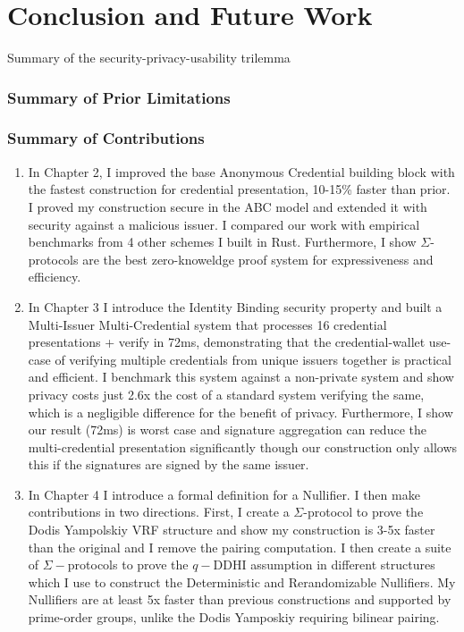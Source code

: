\chapter{Conclusion and Future Work}\label{chap7}
Summary of the security-privacy-usability trilemma


\subsection{Summary of Prior Limitations}



\subsection{Summary of Contributions}
\begin{enumerate}
    \item In Chapter 2, I improved the base Anonymous Credential building block with the fastest construction for credential presentation, 10-15\% faster than prior. I proved my construction secure in the ABC model and extended it with security against a malicious issuer. I compared our work with empirical benchmarks from 4 other schemes I built in Rust. Furthermore, I show $\Sigma$-protocols are the best zero-knoweldge proof system for expressiveness and efficiency. 

    \item In Chapter 3 I introduce the Identity Binding security property and built a Multi-Issuer Multi-Credential system that processes 16 credential presentations + verify in 72ms, demonstrating that the credential-wallet use-case of verifying multiple credentials from unique issuers together is practical and efficient. I benchmark this system against a non-private system and show privacy costs just 2.6x the cost of a standard system verifying the same, which is a negligible difference for the benefit of privacy. Furthermore, I show our result (72ms) is worst case and signature aggregation can reduce the multi-credential presentation significantly though our construction only allows this if the signatures are signed by the same issuer.

    \item In Chapter 4 I introduce a formal definition for a Nullifier. I then make contributions in two directions. First, I create a $\Sigma$-protocol to prove the Dodis Yampolskiy VRF structure and show my construction is 3-5x faster than the original and I remove the pairing computation. I then create a suite of $\Sigma-$protocols to prove the $q-$DDHI assumption in different structures which I use to construct the Deterministic and Rerandomizable Nullifiers. My Nullifiers are at least 5x faster than previous constructions and supported by prime-order groups, unlike the Dodis Yamposkiy requiring bilinear pairing. 


\end{enumerate}

